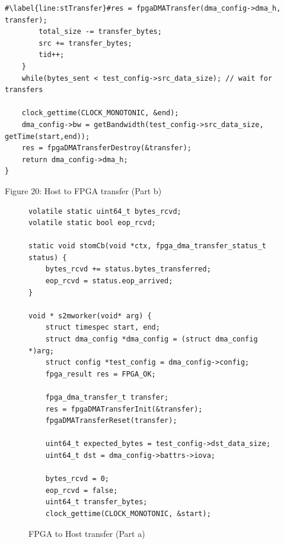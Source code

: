 \documentclass[11pt, twoside, pdftex]{article}
\begin{document}
 \lstset{language=C,numbers=left,escapechar=\#}
\begin{center}
\begin{minipage}[h]{17.5 cm}
\begin{lstlisting}[name=m2sworker]
		#\label{line:stTransfer}#res = fpgaDMATransfer(dma_config->dma_h, transfer);
		total_size -= transfer_bytes;
		src += transfer_bytes;
		tid++;
	}
	while(bytes_sent < test_config->src_data_size); // wait for transfers
	
	clock_gettime(CLOCK_MONOTONIC, &end);
	dma_config->bw = getBandwidth(test_config->src_data_size, getTime(start,end));
	res = fpgaDMATransferDestroy(&transfer);
	return dma_config->dma_h;
}

\end{lstlisting}
\end{minipage}
\begin{center}
Figure 20: Host to FPGA transfer (Part b)
\end{center}
\end{center}

\lstset{language=C,numbers=left,escapechar=\#}
\begin{figure}[H]
\begin{center}
\begin{minipage}[h]{17.5 cm}
\begin{lstlisting}[name=s2mworker]
volatile static uint64_t bytes_rcvd;
volatile static bool eop_rcvd;

static void stomCb(void *ctx, fpga_dma_transfer_status_t status) {
	bytes_rcvd += status.bytes_transferred;
	eop_rcvd = status.eop_arrived;
}

void * s2mworker(void* arg) {
	struct timespec start, end;
	struct dma_config *dma_config = (struct dma_config *)arg;
	struct config *test_config = dma_config->config;
	fpga_result res = FPGA_OK;	
	
	fpga_dma_transfer_t transfer;
	res = fpgaDMATransferInit(&transfer);
	fpgaDMATransferReset(transfer);

	uint64_t expected_bytes = test_config->dst_data_size;
	uint64_t dst = dma_config->battrs->iova;

	bytes_rcvd = 0;
	eop_rcvd = false;
	uint64_t transfer_bytes;
	clock_gettime(CLOCK_MONOTONIC, &start);
\end{lstlisting}
\end{minipage}
\caption{FPGA to Host transfer (Part a)}
\label{fig:s2mworker}
\end{center}
\end{figure}
\end{document}
